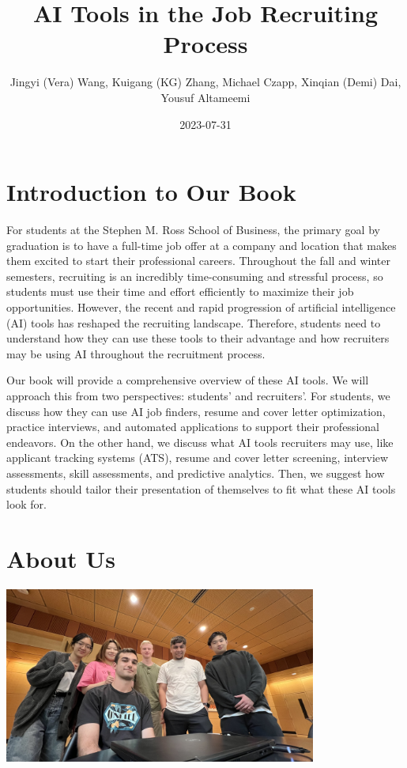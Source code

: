 \documentclass[
]{book}
\title{AI Tools in the Job Recruiting Process}
\author{Jingyi (Vera) Wang, Kuigang (KG) Zhang, Michael Czapp, Xinqian (Demi) Dai, Yousuf Altameemi}
\date{2023-07-31}
\begin{document}
\maketitle

{
\setcounter{tocdepth}{1}
\tableofcontents
}
\hypertarget{introduction-to-our-book}{%
\chapter{Introduction to Our Book}\label{introduction-to-our-book}}

For students at the Stephen M. Ross School of Business, the primary goal by graduation is to have a full-time job offer at a company and location that makes them excited to start their professional careers. Throughout the fall and winter semesters, recruiting is an incredibly time-consuming and stressful process, so students must use their time and effort efficiently to maximize their job opportunities. However, the recent and rapid progression of artificial intelligence (AI) tools has reshaped the recruiting landscape. Therefore, students need to understand how they can use these tools to their advantage and how recruiters may be using AI throughout the recruitment process.

Our book will provide a comprehensive overview of these AI tools. We will approach this from two perspectives: students' and recruiters'. For students, we discuss how they can use AI job finders, resume and cover letter optimization, practice interviews, and automated applications to support their professional endeavors. On the other hand, we discuss what AI tools recruiters may use, like applicant tracking systems (ATS), resume and cover letter screening, interview assessments, skill assessments, and predictive analytics. Then, we suggest how students should tailor their presentation of themselves to fit what these AI tools look for.

\hypertarget{about-us}{%
\chapter{About Us}\label{about-us}}

\includegraphics[width=4.04167in,height=\textheight]{Team Photo.jpg}
\end{document}
